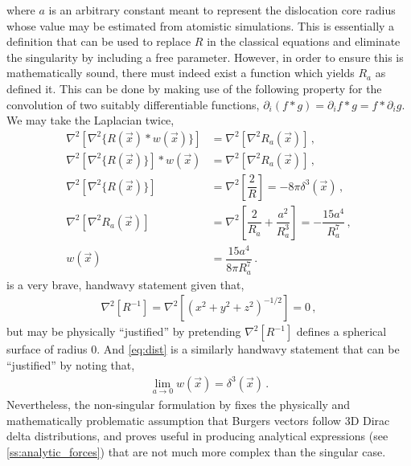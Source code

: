 where $ a $ is an arbitrary constant meant to represent the dislocation core radius whose value may be estimated from atomistic simulations. This is essentially a definition that can be used to replace $ R $ in the classical equations and eliminate the singularity by including a free parameter. However, in order to ensure this is mathematically sound, there must indeed exist a function which yields $ R_{a} $ as \citet{a_non-singular_continuum_theory_of_dislocations} defined it. This can be done by making use of the following property for the convolution of two suitably differentiable functions, $ \partial_{i} (f*g) = \partial_{i}f * g = f * \partial_{i} g $. We may take the Laplacian twice,
\begin{subequations}
    \begin{align}
        \nabla^{2}[\nabla^{2} \{R(\vec{x}) * w(\vec{x})\} ] & = \nabla^{2}[\nabla^{2} R_{a}(\vec{x})]\,,                                                             \\
        \nabla^{2}[\nabla^{2} \{R(\vec{x})\}] * w(\vec{x})  & = \nabla^{2}[\nabla^{2} R_{a}(\vec{x})]\,,                                                             \\
        \nabla^{2}[\nabla^{2} \{R(\vec{x})\}]               & = \nabla^{2}\left[\dfrac{2}{R}\right] = -8\pi \delta^{3}(\vec{x}) \label{eq:hand_wavy}\,,              \\
        \nabla^{2}[\nabla^{2} R_{a}(\vec{x})]               & = \nabla^{2}\left[\dfrac{2}{R_{a}} + \dfrac{a^{2}}{R_{a}^{3}}\right] = -\dfrac{15 a^{4}}{R_{a}^{7}}\,, \\
        w(\vec{x})                                          & = \dfrac{15 a^{4}}{8\pi R_{a}^{7}} \label{eq:dist}\,.
    \end{align}
\end{subequations}
 is a very brave, handwavy statement given that,
\begin{align}
    \nabla^{2} \left[R^{-1}\right]= \nabla^{2}\left[(x^{2} + y^{2} + z^{2})^{-1/2}\right] = 0\,,
\end{align}
but may be physically ``justified'' by pretending $ \nabla^{2}\left[R^{-1}\right] $ defines a spherical surface of radius 0. And \cref{eq:dist} is a similarly handwavy statement that can be ``justified'' by noting that,
\begin{align}
    \lim\limits_{a\to 0} w(\vec{x}) = \delta^{3}(\vec{x})\,.
\end{align}
Nevertheless, the non-singular formulation by \citet{a_non-singular_continuum_theory_of_dislocations} fixes the physically and mathematically problematic assumption that Burgers vectors follow 3D Dirac delta distributions, and proves useful in producing analytical expressions (see \cref{ss:analytic_forces}) that are not much more complex than the singular case.

